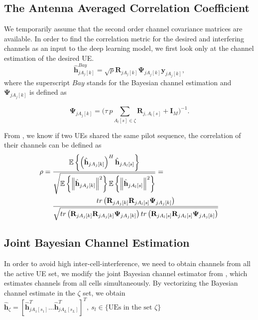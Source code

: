 \subsection{The Antenna Averaged Correlation Coefficient}
We temporarily assume that the second order channel covariance matrices are available. 
In order to find the correlation metric for the desired and interfering channels as an input to the deep learning model, we first look only at the channel estimation of the desired UE.
\begin{equation}
\hat{\mathbf{h}}^{Bay}_{jA_j[k]} = \sqrt{p}\mathbf{R}_{jA_j[k]} \mathbf{\Psi}_{jA_j[k]} \mathbf{y}_{jA_j[k]}, 
\end{equation}
where the superscript $Bay$ stands for the Bayesian channel estimation %
and $\mathbf{\Psi}_{jA_j[k]}$ is defined as


\begin{equation}
\mathbf{\Psi}_{jA_j[k]} = \Bigg(\tau\:{p}\sum_{A_l[s]\in\zeta} \mathbf{R}_{j,A_l[s]} + \mathbf{I}_M\Bigg)^{-1}.
\label{eq:psi_function}
\end{equation}

From \cite{bjornson2017massive}, we know if two UEs shared the same pilot sequence, the correlation of their channels can be defined as
\begin{equation}
\begin{split}
\rho={} &
\frac{\operatorname{\mathbb{E}}\left\{ \left(\hat{\mathbf{h}}_{jA_{j}[k]}\right)^{H}\hat{\mathbf{h}}_{jA_{l}[s]}\right\} }{\sqrt{\operatorname{\mathbb{E}}\left\{ \left\Vert \hat{\mathbf{h}}_{jA_{j}[k]}\right\Vert ^{2}\right\} \operatorname{\mathbb{E}}\left\{ \left\Vert \hat{\mathbf{h}}_{jA_{l}[s]}\right\Vert ^{2}\right\} }}=\\
& \frac{tr\left(\mathbf{R}_{jA_{j}[k]}\mathbf{R}_{jA_{l}[s]}\mathbf{\Psi}_{jA_{j}[k]}\right)}{\sqrt{tr\left(\mathbf{R}_{jA_{j}[k]}\mathbf{R}_{jA_{j}[k]}\mathbf{\Psi}_{jA_{j}[k]}\right)tr\left(\mathbf{R}_{jA_{l}[s]}\mathbf{R}_{jA_{l}[s]}\mathbf{\Psi}_{jA_{j}[k]}\right)}}
\end{split}
\end{equation}

\subsection{Joint Bayesian Channel Estimation}
In order to avoid high inter-cell-interference, we need to obtain channels from all the active UE set, we modify the joint Bayesian channel estimator from \cite{yin2013coordinated}, which estimates channels from all cells simultaneously. By vectorizing the Bayesian channel estimate in the $\zeta$ set, we obtain $\hat{\mathbf{h}}_{\zeta}=[\hat{\mathbf{h}}_{jA_{1}[s_{1}]}^{T}...\hat{\mathbf{h}}_{jA_{L}[s_{L}]}^{T}]^{T},\:s_{l}\in \{\text{UEs in the set } \zeta\}$ 

